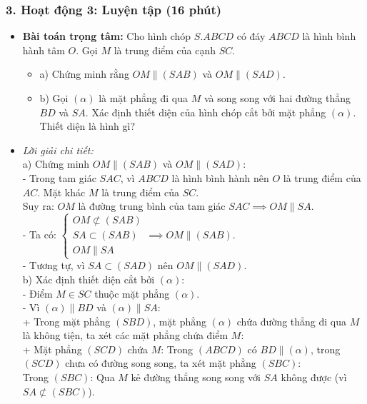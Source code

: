 \documentclass[12pt, a4paper]{article}
\begin{document}
\subsubsection*{3. Hoạt động 3: Luyện tập (16 phút)}
\begin{itemize}
    \item \textbf{Bài toán trọng tâm:} Cho hình chóp $S.ABCD$ có đáy $ABCD$ là hình bình hành tâm $O$. Gọi $M$ là trung điểm của cạnh $SC$.
    \begin{itemize}
        \item a) Chứng minh rằng $OM \parallel (SAB)$ và $OM \parallel (SAD)$.
        \item b) Gọi $(\alpha)$ là mặt phẳng đi qua $M$ và song song với hai đường thẳng $BD$ và $SA$. Xác định thiết diện của hình chóp cắt bởi mặt phẳng $(\alpha)$. Thiết diện là hình gì?
    \end{itemize}
    \item \textit{Lời giải chi tiết:}\\
    a) Chứng minh $OM \parallel (SAB)$ và $OM \parallel (SAD)$:\\
    - Trong tam giác $SAC$, vì $ABCD$ là hình bình hành nên $O$ là trung điểm của $AC$. Mặt khác $M$ là trung điểm của $SC$.\\
    Suy ra: $OM$ là đường trung bình của tam giác $SAC \implies OM \parallel SA$.\\
    - Ta có: $\begin{cases} OM \not\subset (SAB) \\ SA \subset (SAB) \\ OM \parallel SA \end{cases} \implies OM \parallel (SAB)$.\\
    - Tương tự, vì $SA \subset (SAD)$ nên $OM \parallel (SAD)$.\\
    b) Xác định thiết diện cắt bởi $(\alpha)$:\\
    - Điểm $M \in SC$ thuộc mặt phẳng $(\alpha)$.\\
    - Vì $(\alpha) \parallel BD$ và $(\alpha) \parallel SA$:\\
      + Trong mặt phẳng $(SBD)$, mặt phẳng $(\alpha)$ chứa đường thẳng đi qua $M$ là không tiện, ta xét các mặt phẳng chứa điểm $M$:\\
      + Mặt phẳng $(SCD)$ chứa $M$: Trong $(ABCD)$ có $BD \parallel (\alpha)$, trong $(SCD)$ chưa có đường song song, ta xét mặt phẳng $(SBC)$:\\
      Trong $(SBC)$: Qua $M$ kẻ đường thẳng song song với $SA$ không được (vì $SA \not\subset (SBC)$).\\

\end{itemize}
\end{document}
